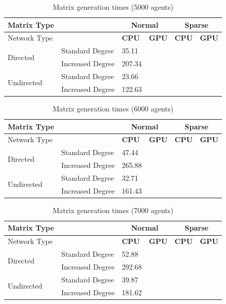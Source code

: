 \documentclass{article}
\begin{document}
\begin{table}[H]
    \centering
    \begin{tabular}{llllll}
        \toprule
        Matrix Type &  & \multicolumn{2}{c}{Normal} & \multicolumn{2}{c}{Sparse}\\
        \midrule 
        Network Type &  &\textbf{CPU} & \textbf{GPU} & \textbf{CPU} & \textbf{GPU} \\
        \midrule
        \multirow{2}{*}{Directed} & Standard Degree & 35.11 & & & \\
                                  & Increased Degree & 207.34 & & & \\
        \multirow{2}{*}{Undirected} & Standard Degree & 23.66 & & & \\
                                  & Increased Degree & 122.63 & & & \\
        \bottomrule
    \end{tabular}
    \label{table:gen_5000}
    \caption{Matrix generation times (5000 agents)}
\end{table}

\begin{table}[H]
    \centering
    \begin{tabular}{llllll}
        \toprule
        Matrix Type &  & \multicolumn{2}{c}{Normal} & \multicolumn{2}{c}{Sparse}\\
        \midrule 
        Network Type &  &\textbf{CPU} & \textbf{GPU} & \textbf{CPU} & \textbf{GPU} \\
        \midrule
        \multirow{2}{*}{Directed} & Standard Degree & 47.44 & & & \\
                                  & Increased Degree & 265.88 & & & \\
        \multirow{2}{*}{Undirected} & Standard Degree & 32.71 & & & \\
                                  & Increased Degree & 161.43 & & & \\
        \bottomrule
    \end{tabular}
    \label{table:gen_6000}
    \caption{Matrix generation times (6000 agents)}
\end{table}

\begin{table}[H]
    \centering
    \begin{tabular}{llllll}
        \toprule
        Matrix Type &  & \multicolumn{2}{c}{Normal} & \multicolumn{2}{c}{Sparse}\\
        \midrule 
        Network Type &  &\textbf{CPU} & \textbf{GPU} & \textbf{CPU} & \textbf{GPU} \\
        \midrule
        \multirow{2}{*}{Directed} & Standard Degree & 52.88 & & & \\
                                  & Increased Degree & 292.68 & & & \\
        \multirow{2}{*}{Undirected} & Standard Degree & 39.87 & & & \\
                                  & Increased Degree & 181.62 & & & \\
        \bottomrule
    \end{tabular}
    \label{table:gen_7000}
    \caption{Matrix generation times (7000 agents)}
\end{table}
\end{document}
